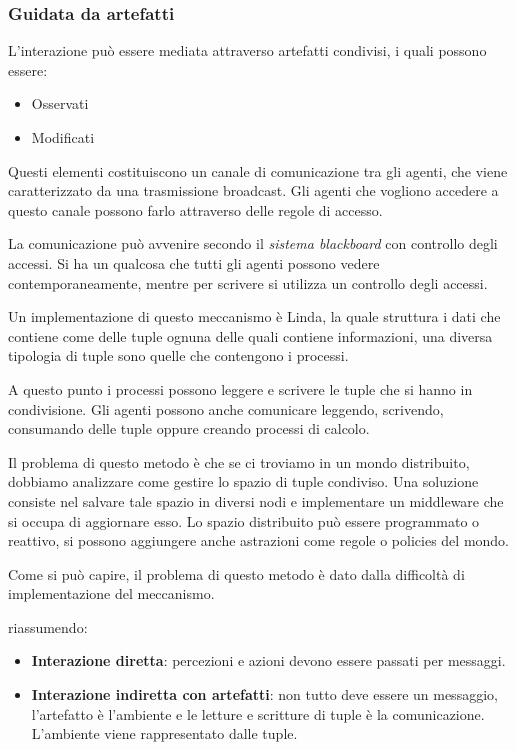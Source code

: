 \subsubsection{Guidata da artefatti}
L'interazione può essere mediata attraverso artefatti condivisi, i quali possono
essere:
\begin{itemize}
    \item Osservati
    \item Modificati
\end{itemize}
Questi elementi costituiscono un canale di comunicazione tra gli agenti, che
viene caratterizzato da una trasmissione broadcast. Gli agenti che vogliono
accedere a questo canale possono farlo attraverso delle regole di accesso.

La comunicazione può avvenire secondo il \textit{sistema blackboard} con
controllo degli accessi. Si ha un qualcosa che tutti gli agenti possono vedere
contemporaneamente, mentre per scrivere si utilizza un controllo degli accessi.

Un implementazione di questo meccanismo è Linda, la quale struttura i dati che
contiene come delle tuple ognuna delle quali contiene informazioni, una diversa
tipologia di tuple sono quelle che contengono i processi.

A questo punto i processi possono leggere e scrivere le tuple che si hanno in
condivisione. Gli agenti possono anche comunicare leggendo, scrivendo,
consumando delle tuple oppure creando processi di calcolo.

Il problema di questo metodo è che se ci troviamo in un mondo distribuito,
dobbiamo analizzare come gestire lo spazio di tuple condiviso. Una soluzione
consiste nel salvare tale spazio in diversi nodi e implementare un middleware che
si occupa di aggiornare esso. Lo spazio distribuito può essere programmato o reattivo,
si possono aggiungere anche astrazioni come regole o policies del mondo.

Come si può capire, il problema di questo metodo è dato dalla difficoltà di
implementazione del meccanismo.

riassumendo:
\begin{itemize}
    \item \textbf{Interazione diretta}: percezioni e azioni devono essere passati
          per messaggi.
    \item \textbf{Interazione indiretta con artefatti}:  non tutto deve essere
          un messaggio, l'artefatto è l'ambiente e le letture e scritture di tuple
          è la comunicazione. L'ambiente viene rappresentato dalle tuple.
\end{itemize}
